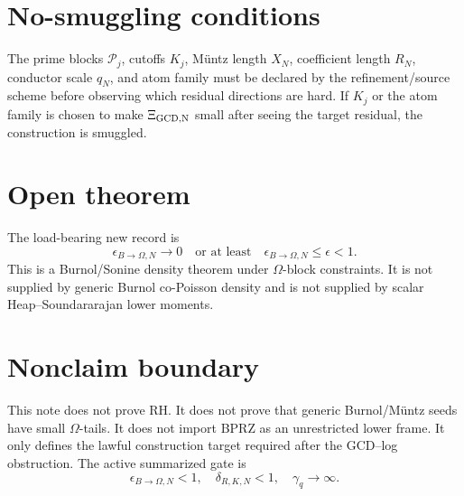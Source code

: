 \documentclass[11pt]{article}
\begin{document}
\section{No-smuggling conditions}

The prime blocks $\mathcal P_j$, cutoffs $K_j$, M\"untz length $X_N$, coefficient length $R_N$, conductor scale $q_N$, and atom family must be declared by the refinement/source scheme before observing which residual directions are hard.  If $K_j$ or the atom family is chosen to make $\Xi_{\rm GCD,N}$ small after seeing the target residual, the construction is smuggled.

\section{Open theorem}

The load-bearing new record is
\[
\boxed{
\epsilon_{B\to\Omega,N}\to0
\quad\text{or at least}\quad
\epsilon_{B\to\Omega,N}\le\epsilon<1.
}
\]
This is a Burnol/Sonine density theorem under $\Omega$-block constraints.  It is not supplied by generic Burnol co-Poisson density and is not supplied by scalar Heap--Soundararajan lower moments.

\section{Nonclaim boundary}

This note does not prove RH.  It does not prove that generic Burnol/M\"untz seeds have small $\Omega$-tails.  It does not import BPRZ as an unrestricted lower frame.  It only defines the lawful construction target required after the GCD--log obstruction.  The active summarized gate is\[\boxed{\epsilon_{B\to\Omega,N}<1,\quad \delta_{R,K,N}<1,\quad \gamma_q\to\infty.}\]
\end{document}
